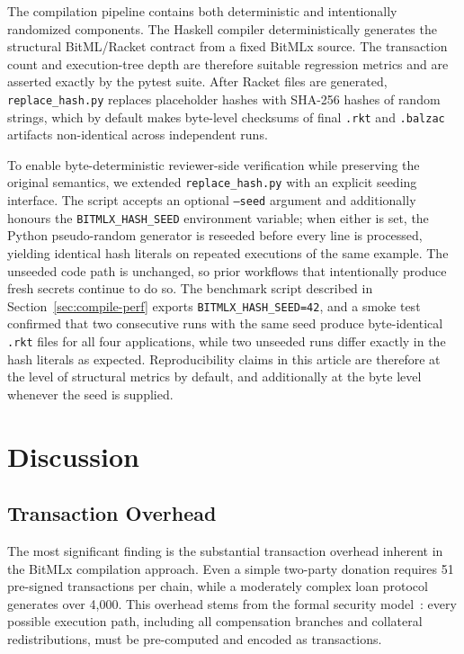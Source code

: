 \documentclass[journal]{IEEEtran}
\begin{document}
The compilation pipeline contains both deterministic and intentionally randomized components. The Haskell compiler deterministically generates the structural BitML/Racket contract from a fixed BitMLx source. The transaction count and execution-tree depth are therefore suitable regression metrics and are asserted exactly by the pytest suite. After Racket files are generated, \texttt{replace\_hash.py} replaces placeholder hashes with SHA-256 hashes of random strings, which by default makes byte-level checksums of final \texttt{.rkt} and \texttt{.balzac} artifacts non-identical across independent runs.

To enable byte-deterministic reviewer-side verification while preserving the original semantics, we extended \texttt{replace\_hash.py} with an explicit seeding interface. The script accepts an optional \texttt{--seed} argument and additionally honours the \texttt{BITMLX\_HASH\_SEED} environment variable; when either is set, the Python pseudo-random generator is reseeded before every line is processed, yielding identical hash literals on repeated executions of the same example. The unseeded code path is unchanged, so prior workflows that intentionally produce fresh secrets continue to do so. The benchmark script described in Section~\ref{sec:compile-perf} exports \texttt{BITMLX\_HASH\_SEED=42}, and a smoke test confirmed that two consecutive runs with the same seed produce byte-identical \texttt{.rkt} files for all four applications, while two unseeded runs differ exactly in the hash literals as expected. Reproducibility claims in this article are therefore at the level of structural metrics by default, and additionally at the byte level whenever the seed is supplied.

\section{Discussion}

\subsection{Transaction Overhead}

The most significant finding is the substantial transaction overhead inherent in the BitMLx compilation approach. Even a simple two-party donation requires 51 pre-signed transactions per chain, while a moderately complex loan protocol generates over 4,000. This overhead stems from the formal security model~\cite{engel2025bitmlx}: every possible execution path, including all compensation branches and collateral redistributions, must be pre-computed and encoded as transactions.
\end{document}
